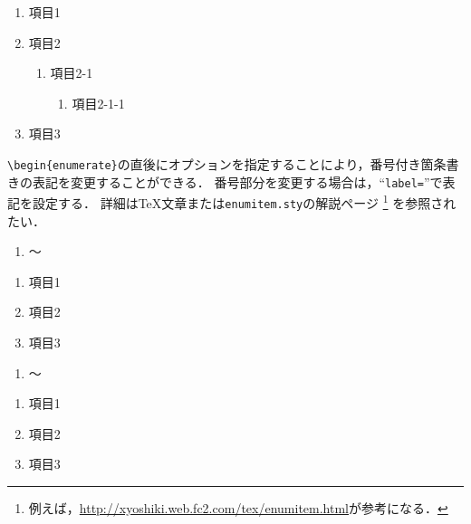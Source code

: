\documentclass[a4j,11pt]{ujreport}
\begin{document}
\begin{screen}
\begin{enumerate}
\item 項目1
\item 項目2
\begin{enumerate}
\item 項目2-1
\begin{enumerate}
\item 項目2-1-1
\end{enumerate}
\end{enumerate}
\item 項目3
\end{enumerate}
\end{screen}

\verb|\begin{enumerate}|の直後にオプションを指定することにより，番号付き箇条書きの表記を変更することができる．
番号部分を変更する場合は，``\texttt{label=}''で表記を設定する．
詳細は{\TeX}文章または\texttt{enumitem.sty}の解説ページ
\footnote{例えば，\url{http://xyoshiki.web.fc2.com/tex/enumitem.html}が参考になる．}
を参照されたい．

\begin{minipage}[t]{0.7\hsize}
\begin{code}
\begin{enumerate}[label=\Alph*\,）]
    \item 〜
\end{enumerate}
\end{code}
\end{minipage}
\quad
\begin{minipage}[t]{0.25\hsize}
\begin{screen}
\begin{enumerate}[label=\Alph*\,）]
\item 項目1
\item 項目2
\item 項目3
\end{enumerate}
\end{screen}
\end{minipage}

\begin{minipage}[t]{0.7\hsize}
\begin{code}
\begin{enumerate}[label=\Roman*.]
    \item 〜
\end{enumerate}
\end{code}
\end{minipage}
\quad
\begin{minipage}[t]{0.25\hsize}
\begin{screen}
\begin{enumerate}[label=\Roman*.]
\item 項目1
\item 項目2
\item 項目3
\end{enumerate}
\end{screen}
\end{minipage}
\end{document}
